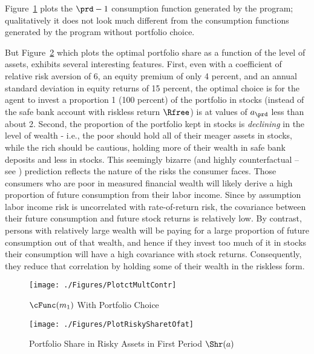 \documentclass[\econtexRoot/SolvingMicroDSOPs]{subfiles}
\begin{document}
Figure~\ref{fig:PlotctMultContr} plots the $\prd-1$ consumption function generated by the program; qualitatively it does not look much different from the consumption functions generated by the program without portfolio choice.

But Figure~\ref{fig:PlotRiskySharetOfat} which plots the optimal portfolio share as a function of the level of assets, exhibits several interesting features.  First, even with a coefficient of relative risk aversion of 6, an equity premium of only 4 percent, and an annual standard deviation in equity returns of 15 percent, the optimal choice is for the agent to invest a proportion 1 (100 percent) of the portfolio in stocks (instead of the safe bank account with riskless return $\Rfree$) is at values of $a_{\prd}$ less than about 2.  Second, the proportion of the portfolio kept in stocks is \textit{declining} in the level of wealth - i.e., the poor should hold all of their meager assets in stocks, while the rich should be cautious, holding more of their wealth in safe bank deposits and less in stocks.  This seemingly bizarre (and highly counterfactual -- see \cite{carroll:richportfolios}) prediction reflects the nature of the risks the consumer faces.  Those consumers who are poor in measured financial wealth will likely derive a high proportion of future consumption from their labor income.  Since by assumption labor income risk is uncorrelated with rate-of-return risk, the covariance between their future consumption and future stock returns is relatively low.  By contrast, persons with relatively large wealth will be paying for a large proportion of future consumption out of that wealth, and hence if they invest too much of it in stocks their consumption will have a high covariance with stock returns.  Consequently, they reduce that correlation by holding some of their wealth in the riskless form.

\hypertarget{PlotctMultContr}{}
\begin{figure}
  \texttt{[image: ./Figures/PlotctMultContr]}
  \caption{$\cFunc(m_{1})$ With Portfolio Choice}
  \label{fig:PlotctMultContr}
\end{figure}

\hypertarget{PlotRiskySharetOfat}{}
\begin{figure}
  \texttt{[image: ./Figures/PlotRiskySharetOfat]}
  \caption{Portfolio Share in Risky Assets in First Period $\Shr(a)$}
  \label{fig:PlotRiskySharetOfat}
\end{figure}
\end{document}

